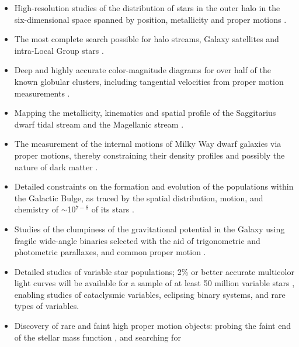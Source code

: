 \begin{itemize}
\item High-resolution studies of the distribution of stars in the outer halo
          in the six-dimensional space spanned by position, metallicity and proper
          motions \citep[e.g.,][]{2006AJ....132.1768G,2008ApJ...680..295B,2008ApJ...673..864J,2008ApJ...684..287I,2010ApJ...716....1B}.
\item The most complete search possible for halo streams, Galaxy satellites and intra-Local Group
          stars \citep[e.g.][]{2007ApJ...654..897B,2009AJ....137..450W,2014AJ....147...76B}.
\item Deep and highly accurate color-magnitude diagrams for over half of the known
          globular clusters, including tangential velocities from proper motion
          measurements \citep{2008ApJS..179..326A,2007AJ....134..195C}.
\item Mapping the metallicity, kinematics and spatial profile of the Saggitarius dwarf tidal
          stream \citep[e.g.,][]{2001ApJ...547L.133I,2003ApJ...599.1082M,2005ApJ...619..807L,2014MNRAS.437..116B}
          and the Magellanic stream \citep{2004AJ....128.1606Z}.
\item The measurement of the internal motions of Milky Way dwarf
          galaxies via proper motions, thereby constraining their density profiles and
	  possibly the nature of dark matter \citep[e.g.,][]{2011ApJ...742...20W}.
\item Detailed constraints on the formation and evolution of the populations within the Galactic Bulge, as traced by the spatial
          distribution, motion, and chemistry of $\sim$10$^{7-8}$ of its stars
          \citep[e.g.][]{2011A&A...534A..80H,2014ApJ...787L..19N}.
\item Studies of the clumpiness of the gravitational potential in the Galaxy using
          fragile wide-angle binaries selected with the aid of trigonometric and
          photometric parallaxes, and common proper motion \cite[e.g.,][]{2004ApJ...601..311Y,2010A&A...509A..46L}.
\item Detailed studies of variable star populations; 2\% or better accurate
          multicolor light curves will be available for a sample of at least 50
          million variable stars \citep{2007AJ....134.2236S}, enabling studies of
          cataclysmic variables, eclipsing binary systems, and rare types of variables.
\item Discovery of rare and faint high proper motion objects: probing the
          faint end of the stellar mass function \citep{2008AJ....135.2177L,2010AJ....140..844F}, and searching for

\end{itemize}

